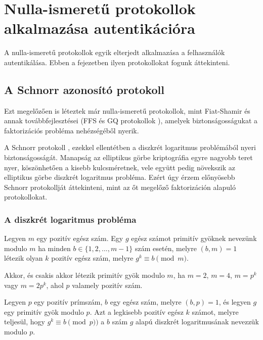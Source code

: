 \chapter{Nulla-ismeretű protokollok alkalmazása autentikációra}

A nulla-ismeretű protokollok egyik elterjedt alkalmazása a felhasználók autentikálása. Ebben a fejezetben ilyen protokollokat fogunk áttekinteni.

\section{A Schnorr azonosító protokoll}

Ezt megelőzően is léteztek már nulla-ismeretű protokollok, mint Fiat-Shamir \cite{FiatShamir} és annak továbbfejlesztései (FFS \cite{FeigeFiatShamir} és GQ protokollok \cite{GuillouQuisquater}), amelyek biztonságosságukat a faktorizációs probléma nehézségéből nyerik. 

A Schnorr protokoll \cite{Schnorr}, ezekkel ellentétben a diszkrét logaritmus problémából nyeri biztonságosságát. Manapság az elliptikus görbe kriptográfia egyre nagyobb teret nyer, köszönhetően a kisebb kulcsméretnek, vele együtt pedig növekszik az elliptikus görbe diszkrét logaritmus probléma. Ezért úgy érzem előnyösebb Schnorr protokollját áttekinteni, mint az őt megelőző faktorizáción alapuló protokollokat.

\subsection{A diszkrét logaritmus probléma}\cite{BerczesPetho}

\begin{definition}
    Legyen $m$ egy pozitív egész szám. Egy $g$ egész számot primitív gyöknek nevezünk modulo $m$ ha minden $b \in \{1,2,...,m-1\}$ szám esetén, melyre $(b,m) = 1$ létezik olyan $k$ pozitív egész szám, melyre $g^k \equiv b \pmod{m}$.
\end{definition}

\begin{theorem}
    Akkor, és csakis akkor létezik primitív gyök modulo $m$, ha $m = 2$, $m = 4$, $m = p^k$ vagy $m = 2p^k$, ahol $p$ valamely pozitív szám.
\end{theorem}

\begin{definition}
    Legyen $p$ egy pozitív prímszám, $b$ egy egész szám, melyre $(b, p) = 1$, és legyen $g$ egy primitív gyök modulo $p$. Azt a legkisebb pozitív egész $k$ számot, melyre teljesül, hogy $g^k \equiv b \pmod{p})$ a $b$ szám $g$ alapú diszkrét logaritmusának nevezzük modulo $p$.
\end{definition}


